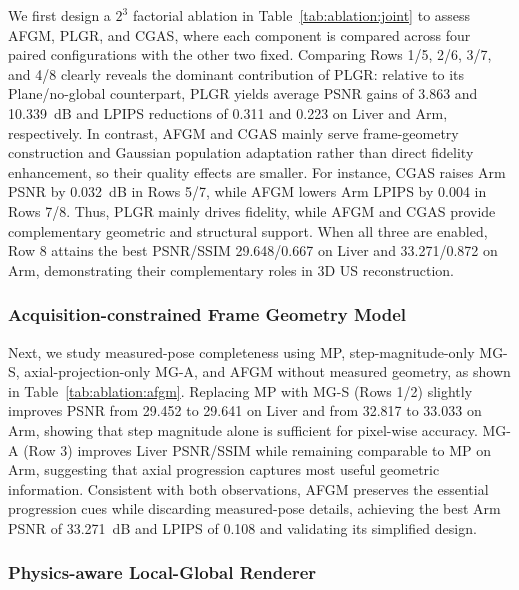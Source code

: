 We first design a $2^3$ factorial ablation in
Table~\ref{tab:ablation:joint} to assess AFGM, PLGR, and CGAS, where
each component is compared across four paired configurations with the other
two fixed. 
Comparing Rows 1/5, 2/6, 3/7, and 4/8 clearly reveals the dominant
contribution of PLGR: relative to its Plane/no-global counterpart, PLGR yields
average PSNR gains of 3.863 and 10.339~dB and LPIPS reductions of 0.311 and
0.223 on Liver and Arm, respectively. In contrast, AFGM and CGAS mainly serve
frame-geometry construction and Gaussian population adaptation rather than
direct fidelity enhancement, so their quality effects are smaller. For
instance, CGAS raises Arm PSNR by 0.032~dB in Rows 5/7, while AFGM lowers Arm
LPIPS by 0.004 in Rows 7/8. 
Thus, PLGR mainly drives fidelity, while AFGM and CGAS provide complementary
geometric and structural support.
When all three are enabled, Row 8 attains the best PSNR/SSIM
29.648/0.667 on Liver and 33.271/0.872 on Arm, demonstrating their
complementary roles in 3D US reconstruction.



\subsubsection{Acquisition-constrained Frame Geometry Model}

Next, we study measured-pose completeness using MP, step-magnitude-only MG-S,
axial-projection-only MG-A, and AFGM without measured geometry, as shown
in Table~\ref{tab:ablation:afgm}. Replacing MP with MG-S
(Rows 1/2) slightly improves PSNR from 29.452 to 29.641 on Liver and from
32.817 to 33.033 on Arm, showing that step magnitude alone is sufficient 
for pixel-wise accuracy.
MG-A (Row 3) improves Liver PSNR/SSIM while remaining comparable to MP on Arm,
suggesting that axial progression captures most useful
geometric information. Consistent with both observations, AFGM preserves the essential
progression cues while discarding measured-pose details, achieving the best
Arm PSNR of 33.271~dB and LPIPS of 0.108 and validating its simplified design.



\subsubsection{Physics-aware Local-Global Renderer}

